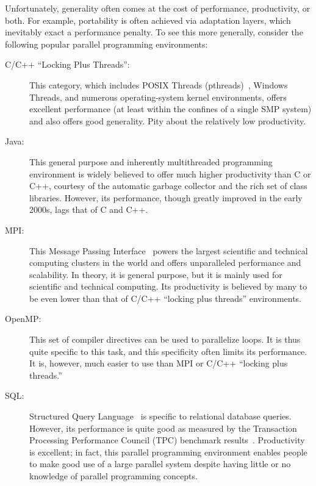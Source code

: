 Unfortunately, generality often comes at the cost of performance,
productivity, or both.
For example, portability is often achieved via adaptation layers,
which inevitably exact a performance penalty.
To see this more generally, consider the following popular parallel
programming environments:

\begin{description}
\item[C/C++ ``Locking Plus Threads'':] This category, which includes
	POSIX Threads (pthreads)~\cite{OpenGroup1997pthreads},
	Windows Threads, and numerous
	operating-system kernel environments, offers excellent performance
	(at least within the confines of a single SMP system)
	and also offers good generality.
	Pity about the relatively low productivity.
\item[Java:] This general purpose and inherently multithreaded
	programming environment	is widely believed to offer much higher
	productivity than C or C++, courtesy of the automatic garbage collector
	and the rich set of class libraries.
	However, its performance, though greatly improved in the early
	2000s, lags that of C and C++.
\item[MPI:] This Message Passing Interface~\cite{MPIForum2008} powers
	the largest scientific and technical computing clusters in
	the world and offers unparalleled performance and scalability.
	In theory, it is general purpose, but it is mainly used
	for scientific and technical computing.
	Its productivity is believed by many to be even lower than that
	of C/C++ ``locking plus threads'' environments.
\item[OpenMP:] This set of compiler directives can be used
	to parallelize loops.  It is thus quite specific to this
	task, and this specificity often limits its performance.
	It is, however, much easier to use than MPI or C/C++
	``locking plus threads.''
\item[SQL:] Structured Query Language~\cite{DIS9075SQL92} is
	specific to relational database queries.
	However, its performance is quite good as measured by the
	Transaction Processing Performance Council (TPC)
	benchmark results~\cite{TPC}.
	Productivity is excellent; in fact, this parallel programming
	environment enables people to make good use of a large parallel
	system despite having little or no knowledge of parallel
	programming concepts.
\end{description}

